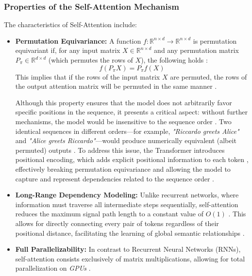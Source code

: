 \subsubsection{Properties of the Self-Attention Mechanism}
The characteristics of Self-Attention include:
\begin{itemize}
\item \textbf{Permutation Equivariance:} A function $f:\mathbb{R}^{n\times d} \rightarrow \mathbb{R}^{n\times d}$ is permutation equivariant if, for any input matrix $X \in \mathbb{R}^{n\times d}$ and any permutation matrix $P_\pi \in \mathbb{R}^{d\times d}$ (which permutes the rows of $X$), the following holds \cite{arxiv-permutation-equivariance-transformers}:
\begin{equation}
f(P_\pi X) = P_\pi f(X)
\end{equation}
This implies that if the rows of the input matrix $X$ are permuted, the rows of the output attention matrix will be permuted in the same manner \cite{arxiv-permutation-equivariance-transformers, git-hub}.

Although this property ensures that the model does not arbitrarily favor specific positions in the sequence, it presents a critical aspect: without further mechanisms, the model would be insensitive to the sequence order \cite{arxiv-permutation-equivariance-transformers}. Two identical sequences in different orders—for example, \textit{"Riccardo greets Alice"} and \textit{"Alice greets Riccardo"}—would produce numerically equivalent (albeit permuted) outputs \cite{arxiv-permutation-equivariance-transformers}. To address this issue, the Transformer introduces positional encoding, which adds explicit positional information to each token \cite{arxiv-permutation-equivariance-transformers, git-hub, arxiv-attention}, effectively breaking permutation equivariance and allowing the model to capture and represent dependencies related to the sequence order \cite{arxiv-permutation-equivariance-transformers}.

\item \textbf{Long-Range Dependency Modeling:} Unlike recurrent networks, where information must traverse all intermediate steps sequentially, self-attention reduces the maximum signal path length to a constant value of $O(1)$ \cite{arxiv-attention, stanford}. This allows for directly connecting every pair of tokens regardless of their positional distance, facilitating the learning of global semantic relationships \cite{arxiv-attention, GeeksForGeeks}.

\item \textbf{Full Parallelizability:} In contrast to Recurrent Neural Networks (RNNs), self-attention consists exclusively of matrix multiplications, allowing for total parallelization on \textit{GPUs} \cite{arxiv-attention, git-hub}.


\end{itemize}
